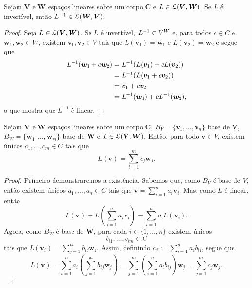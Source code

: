 \begin{proposition}
Sejam $\bm V$ e $\bm W$ espaços lineares sobre um corpo $\bm C$ e $L \in \mathcal{L}(\bm V,\bm W)$. Se $L$ é invertível, então $L^{-1} \in \mathcal{L}(\bm W,\bm V)$.
\end{proposition}
\begin{proof}
Seja $L \in \mathcal{L}(\bm V,\bm W)$. Se $L$ é invertível, $L^{-1} \in V^W$ e, para todos $c \in C$ e $\bm w_1,\bm w_2 \in W$, existem $\bm v_1,\bm v_2 \in V$ tais que $L(\bm v_1)=\bm w_1$ e $L(\bm v_2)=\bm w_2$ e segue que
	\begin{align*}
	L^{-1}(\bm w_1+c\bm w_2)&=L^{-1}(L(\bm v_1)+cL(\bm v_2)) \\
	&= L^{-1}(L(\bm v_1+c\bm v_2)) \\
	&= \bm v_1+c\bm v_2 \\
	&= L^{-1}(\bm w_1)+cL^{-1}(\bm w_2),
	\end{align*}
o que mostra que $L^{-1}$ é linear.
\end{proof}

\begin{proposition}
Sejam $\bm V$ e $\bm W$ espaços lineares sobre um corpo $\bm C$, $B_V=\{\bm v_1,\ldots,\bm v_n\}$ base de $\bm V$, $B_W=\{\bm w_1,\ldots,\bm w_m\}$ base de $\bm W$ e $L \in \mathcal{L}(\bm V,\bm W)$. Então, para todo $\bm v \in V$, existem únicos $c_1,\ldots,c_m \in C$ tais que
	\begin{equation*}
	L(\bm v) = \sum_{i=1}^m c_j \bm w_j.
	\end{equation*}
\end{proposition}
\begin{proof}
	Primeiro demonstraremos a existência. Sabemos que, como $B_V$ é base de $V$, então existem únicos $a_1,\ldots,a_n \in C$ tais que $\bm v = \sum_{i=1}^n a_i\bm v_i$. Mas, como $L$ é linear, então
	\begin{equation*}
	L(\bm v) = L\left( \sum_{i=1}^n a_i \bm v_i \right) = \sum_{i=1}^n a_i L(\bm v_i).
	\end{equation*}
	Agora, como $B_W$ é base de $\bm W$, para cada $i \in \{1,\ldots,n\}$ existem únicos
	\begin{equation*}
	b_{i1},\ldots,b_{im} \in C
	\end{equation*}
tais que  $L(\bm v_i)=\sum_{j=1}^m b_{ij} \bm w_j$. Assim, definindo $c_j := \sum_{i=1}^n a_i b_{ij}$, segue que
	\begin{equation*}
	L(\bm v)=\sum_{i=1}^n a_i \left(\sum_{j=1}^m b_{ij} \bm w_j \right) = \sum_{j=1}^m \left(\sum_{i=1}^n a_i b_{ij}\right) \bm w_j = \sum_{j=1}^m c_j \bm w_j.
	\end{equation*}

\end{proof}

